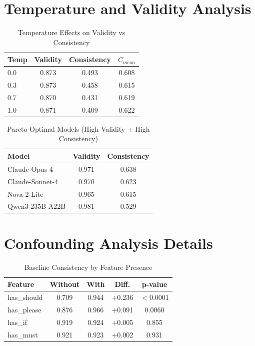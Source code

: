 \documentclass[sigconf,anonymous,review]{acmart}
\begin{document}
\section{Temperature and Validity Analysis}
\label{app:temp_validity}

\begin{table}[h]
\centering
\caption{Temperature Effects on Validity vs Consistency}
\small
\begin{tabular}{@{}lccc@{}}
\toprule
\textbf{Temp} & \textbf{Validity} & \textbf{Consistency} & \textbf{$C_{mean}$} \\
\midrule
0.0 & 0.873 & 0.493 & 0.608 \\
0.3 & 0.873 & 0.458 & 0.615 \\
0.7 & 0.870 & 0.431 & 0.619 \\
1.0 & 0.871 & 0.409 & 0.622 \\
\bottomrule
\end{tabular}
\end{table}

\begin{table}[h]
\centering
\caption{Pareto-Optimal Models (High Validity + High Consistency)}
\small
\begin{tabular}{@{}lcc@{}}
\toprule
\textbf{Model} & \textbf{Validity} & \textbf{Consistency} \\
\midrule
Claude-Opus-4 & 0.971 & 0.638 \\
Claude-Sonnet-4 & 0.970 & 0.623 \\
Nova-2-Lite & 0.965 & 0.615 \\
Qwen3-235B-A22B & 0.981 & 0.529 \\
\bottomrule
\end{tabular}
\end{table}

\section{Confounding Analysis Details}
\label{app:confounding}

\begin{table}[h]
\centering
\caption{Baseline Consistency by Feature Presence}
\small
\begin{tabular}{@{}lcccc@{}}
\toprule
\textbf{Feature} & \textbf{Without} & \textbf{With} & \textbf{Diff.} & \textbf{p-value} \\
\midrule
has\_should & 0.709 & 0.944 & +0.236 & $<$0.0001 \\
has\_please & 0.876 & 0.966 & +0.091 & 0.0060 \\
has\_if & 0.919 & 0.924 & +0.005 & 0.855 \\
has\_must & 0.921 & 0.923 & +0.002 & 0.931 \\
\bottomrule
\end{tabular}
\end{table}
\end{document}
